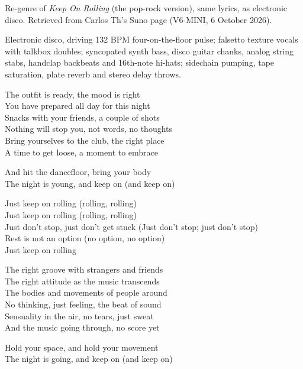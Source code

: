 
\begin{notes}
Re-genre of \emph{Keep On Rolling} (the pop-rock version), same lyrics, as electronic disco. Retrieved from Carlos Th's Suno page (V6-MINI, 6 October 2026).
\end{notes}
\begin{style}
Electronic disco, driving 132 BPM four-on-the-floor pulse; falsetto texture vocals with talkbox doubles; syncopated synth bass, disco guitar chanks, analog string stabs, handclap backbeats and 16th-note hi-hats; sidechain pumping, tape saturation, plate reverb and stereo delay throws.
\end{style}
\begin{lyrics}
The outfit is ready, the mood is right\\
You have prepared all day for this night\\
Snacks with your friends, a couple of shots\\
Nothing will stop you, not words, no thoughts\\
Bring yourselves to the club, the right place\\
A time to get loose, a moment to embrace

And hit the dancefloor, bring your body\\
The night is young, and keep on (and keep on)

Just keep on rolling (rolling, rolling)\\
Just keep on rolling (rolling, rolling)\\
Just don't stop, just don't get stuck
(Just don't stop; just don't stop)\\
Rest is not an option (no option, no option)\\
Just keep on rolling

The right groove with strangers and friends\\
The right attitude as the music transcends\\
The bodies and movements of people around\\
No thinking, just feeling, the beat of sound\\
Sensuality in the air, no tears, just sweat\\
And the music going through, no score yet

Hold your space, and hold your movement\\
The night is going, and keep on (and keep on)


\end{lyrics}
